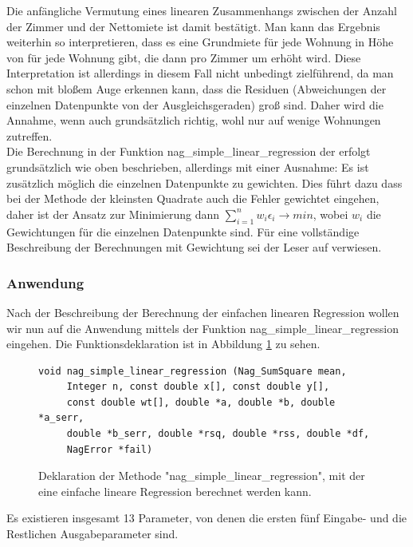Die anfängliche Vermutung eines linearen Zusammenhangs zwischen der Anzahl der Zimmer und der Nettomiete ist damit bestätigt.
Man kann das Ergebnis weiterhin so interpretieren, dass es eine Grundmiete für jede Wohnung in Höhe von  für jede Wohnung gibt, die dann pro Zimmer um  erhöht wird.
Diese Interpretation ist allerdings in diesem Fall nicht unbedingt zielführend, da man schon mit bloßem Auge erkennen kann, dass die Residuen (Abweichungen der einzelnen Datenpunkte von der Ausgleichsgeraden) groß sind.
Daher wird die Annahme, wenn auch grundsätzlich richtig, wohl nur auf wenige Wohnungen zutreffen.
\\

Die Berechnung in der Funktion nag\_simple\_linear\_regression der \naglib erfolgt grundsätzlich wie oben beschrieben, allerdings mit einer Ausnahme: Es ist zusätzlich möglich die einzelnen Datenpunkte zu gewichten.
Dies führt dazu dass bei der Methode der kleinsten Quadrate auch die Fehler gewichtet eingehen, daher ist der Ansatz zur Minimierung dann $\sum\limits_{i=1}^{n}w_i\epsilon_i \rightarrow min$, wobei $w_i$ die Gewichtungen für die einzelnen Datenpunkte sind.
Für eine vollständige Beschreibung der Berechnungen mit Gewichtung sei der Leser auf \cite{nag:simple_regression} verwiesen.

\subsubsection{Anwendung}
\label{sec:sim_reg_anwendung}

Nach der Beschreibung der Berechnung der einfachen linearen Regression wollen wir nun auf die Anwendung mittels der Funktion nag\_simple\_linear\_regression eingehen.
Die Funktionsdeklaration ist in Abbildung \ref{fig:nag_simple_linear} zu sehen.
\begin{figure}[t]
  \centering
\begin{lstlisting}
void nag_simple_linear_regression (Nag_SumSquare mean, 
     Integer n, const double x[], const double y[], 
     const double wt[], double *a, double *b, double *a_serr, 
     double *b_serr, double *rsq, double *rss, double *df,
     NagError *fail)
\end{lstlisting}
  \caption{Deklaration der Methode "nag\_simple\_linear\_regression", mit der eine einfache lineare Regression berechnet werden kann. }
  \label{fig:nag_simple_linear}
\end{figure}
Es existieren insgesamt 13 Parameter, von denen die ersten fünf Eingabe- und die Restlichen Ausgabeparameter sind.

